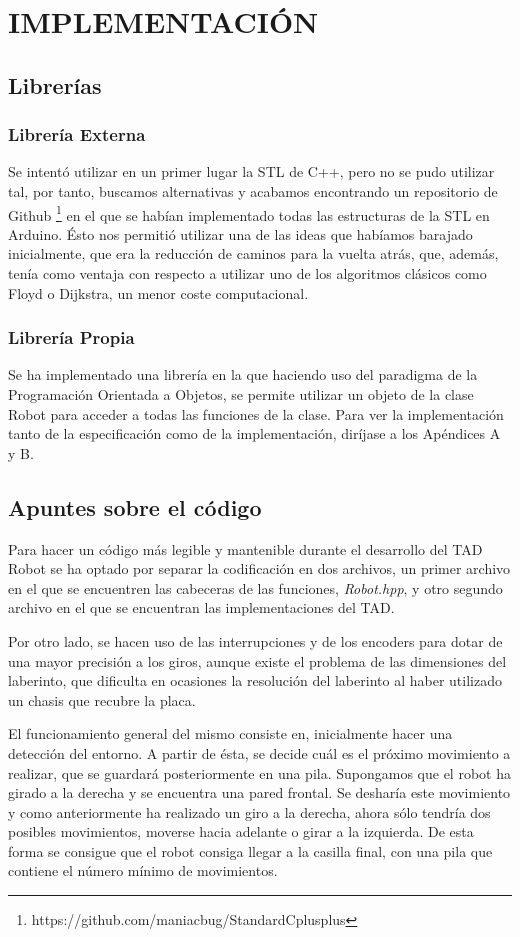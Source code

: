 \chapter{IMPLEMENTACIÓN}

\section{Librerías}
\subsection{Librería Externa}
Se intentó utilizar en un primer lugar la STL de C++, pero no se pudo utilizar tal, por tanto, buscamos alternativas y acabamos encontrando un repositorio de Github \footnote{https://github.com/maniacbug/StandardCplusplus} en el que se habían implementado todas las estructuras de la STL en Arduino. Ésto nos permitió utilizar una de las ideas que habíamos barajado inicialmente, que era la reducción de caminos para la vuelta atrás, que, además, tenía como ventaja con respecto a utilizar uno de los algoritmos clásicos como Floyd o Dijkstra, un menor coste computacional.

\subsection{Librería Propia}
Se ha implementado una librería en la que haciendo uso del paradigma de la Programación Orientada a Objetos, se permite utilizar un objeto de la clase Robot para acceder a todas las funciones de la clase. Para ver la implementación tanto de la especificación como de la implementación, diríjase a los Apéndices A y B.

\section{Apuntes sobre el código}

Para hacer un código más legible y mantenible durante el desarrollo del TAD Robot se ha optado por separar la codificación en dos archivos, un primer archivo en el que se encuentren las cabeceras de las funciones, \textit{Robot.hpp}, y otro segundo archivo en el que se encuentran las implementaciones del TAD.

Por otro lado, se hacen uso de las interrupciones y de los encoders para dotar de una mayor precisión a los giros, aunque existe el problema de las dimensiones del laberinto, que dificulta en ocasiones la resolución del laberinto al haber utilizado un chasis que recubre la placa.

El funcionamiento general del mismo consiste en, inicialmente hacer una detección del entorno. A partir de ésta, se decide cuál es el próximo movimiento a realizar, que se guardará posteriormente en una pila. Supongamos que el robot ha girado a la derecha y se encuentra una pared frontal. Se desharía este movimiento y como anteriormente ha realizado un giro a la derecha, ahora sólo tendría dos posibles movimientos, moverse hacia adelante o girar a la izquierda. De esta forma se consigue que el robot consiga llegar a la casilla final, con una pila que contiene el número mínimo de movimientos.

